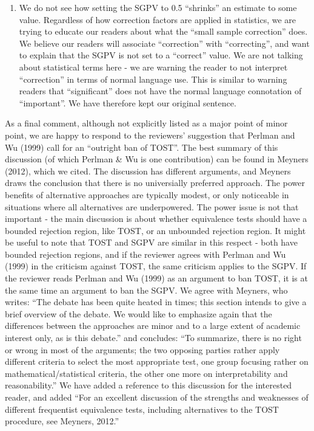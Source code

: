 \documentclass[man]{apa6}
\providecommand{\tightlist}{%
  \setlength{\itemsep}{0pt}\setlength{\parskip}{0pt}}
\begin{document}
\begin{enumerate}
\def\labelenumi{\arabic{enumi}.}
\setcounter{enumi}{7}
\tightlist
\item
  We do not see how setting the SGPV to 0.5 \enquote{shrinks} an
  estimate to some value. Regardless of how correction factors are
  applied in statistics, we are trying to educate our readers about what
  the \enquote{small sample correction} does. We believe our readers
  will associate \enquote{correction} with \enquote{correcting}, and
  want to explain that the SGPV is not set to a \enquote{correct} value.
  We are not talking about statistical terms here - we are warning the
  reader to not interpret \enquote{correction} in terms of normal
  language use. This is similar to warning readers that
  \enquote{significant} does not have the normal language connotation of
  \enquote{important}. We have therefore kept our original sentence.
\end{enumerate}

As a final comment, although not explicitly listed as a major point of
minor point, we are happy to respond to the reviewers' suggestion that
Perlman and Wu (1999) call for an \enquote{outright ban of TOST}. The
best summary of this discussion (of which Perlman \& Wu is one
contribution) can be found in Meyners (2012), which we cited. The
discussion has different arguments, and Meyners draws the conclusion
that there is no universially preferred approach. The power benefits of
alternative approaches are typically modest, or only noticeable in
situations where all alternatives are underpowered. The power issue is
not that important - the main discussion is about whether equivalence
tests should have a bounded rejection region, like TOST, or an unbounded
rejection region. It might be useful to note that TOST and SGPV are
similar in this respect - both have bounded rejection regions, and if
the reviewer agrees with Perlman and Wu (1999) in the criticism against
TOST, the same criticism applies to the SGPV. If the reviewer reads
Perlman and Wu (1999) as an argument to ban TOST, it is at the same time
an argument to ban the SGPV. We agree with Meyners, who writes:
\enquote{The debate has been quite heated in times; this section intends
to give a brief overview of the debate. We would like to emphasize again
that the differences between the approaches are minor and to a large
extent of academic interest only, as is this debate.} and concludes:
\enquote{To summarize, there is no right or wrong in most of the
arguments; the two opposing parties rather apply different criteria to
select the most appropriate test, one group focusing rather on
mathematical/statistical criteria, the other one more on
interpretability and reasonability.} We have added a reference to this
discussion for the interested reader, and added \enquote{For an
excellent discussion of the strengths and weaknesses of different
frequentist equivalence tests, including alternatives to the TOST
procedure, see Meyners, 2012.}
\end{document}
